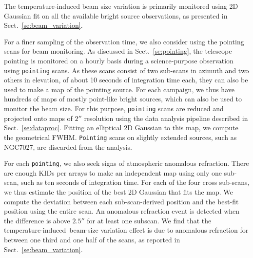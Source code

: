 \documentclass[traditionalabstract]{aa}
\newcommand{\afternoon}{temperature-induced}
\newcommand{\lp}[1]{#1}
\begin{document}
{\begin{appendix}
The temperature-induced beam size variation is primarily monitored
using 2D Gaussian fit on all the available bright source observations,
as presented in Sect.~\ref{se:beam_variation}. 

For a finer sampling of the observation time, we also consider using
the pointing scans for beam monitoring. As discussed in
Sect.~\ref{se:pointing}, the telescope pointing is
monitored on a hourly basis during a science-purpose observation using {\tt pointing}
scans. As these scans consist of two sub-scans in azimuth and two others
in elevation, of about 10 seconds of integration time each, they
can also be used to make a map of the pointing source. For each campaign,
we thus have hundreds of maps of mostly point-like bright
sources, which can also be used to monitor the beam size. 
For this purpose, {\tt pointing} scans are reduced 
and projected onto maps of $2''$ resolution using
the data analysis pipeline described in Sect.~\ref{se:dataproc}.
Fitting an elliptical 2D Gaussian to this map, we compute the geometrical FWHM. %
{\tt Pointing} scans on {\lp slightly extended} sources, such as NGC7027,
are discarded from the analysis.

For each {\tt pointing}, we also seek signs of atmospheric
anomalous refraction. There are
enough KIDs per arrays to make an independent map using only
one sub-scan, such as ten seconds of integration time.
For each of the four cross sub-scans, we thus estimate the position of the best
2D Gaussian that fits the map. We compute the deviation between each
sub-scan-derived position and the best-fit position using the entire
scan. An anomalous refraction event is detected when the difference is
above $2.5''$ for at least one subscan. We find that the \afternoon\
beam-size variation effect is due to anomalous refraction for
between one third and one half of the scans, as reported in
Sect.~\ref{se:beam_variation}.


\end{appendix}}
\end{document}
